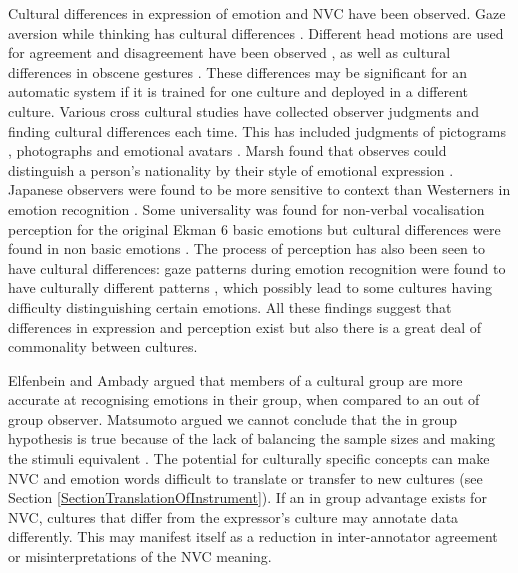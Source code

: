 
Cultural differences in expression of emotion and \ac{NVC} have been observed. Gaze aversion while thinking has cultural differences \cite{McCarthy2006}. Different head motions are used for agreement and disagreement have been observed \cite{Kassabova2008}, as well as cultural differences in obscene gestures \cite{Knapp2009}. These differences may be significant for an automatic system if it is trained for one culture and deployed in a different culture. Various cross cultural studies have collected observer judgments and finding cultural differences each time. This has included judgments of pictograms \cite{Cho2007}, photographs \cite{Matsumoto08} and emotional avatars \cite{Massaro96} \cite{Koda2007}. Marsh \etal found that observes could distinguish a person's nationality by their style of emotional expression \cite{Marsh2003}. Japanese observers were found to be more sensitive to context than Westerners in emotion recognition \cite{Masuda2008}. Some universality was found for non-verbal vocalisation perception for the original Ekman 6 basic emotions but cultural differences were found in non basic emotions \cite{Sauter2009}. The process of perception has also been seen to have cultural differences: gaze patterns during emotion recognition were found to have culturally different patterns \cite{Jack2009}, which possibly lead to some cultures having difficulty distinguishing certain emotions. All these findings suggest that differences in expression and perception exist but also there is a great deal of commonality between cultures.



Elfenbein and Ambady \cite{Elfenbein2002b} \cite{Elfenbein2002} argued that members of a cultural group are more accurate at recognising emotions in their group, when compared to an out of group observer. Matsumoto argued we cannot conclude that the in group hypothesis is true because of the lack of balancing the sample sizes and making the stimuli equivalent \cite{Matsumoto2006}. The potential for culturally specific concepts can make \ac{NVC} and emotion words difficult to translate or transfer to new cultures (see Section \ref{SectionTranslationOfInstrument}). If an in group advantage exists for \ac{NVC}, cultures that differ from the expressor's culture may annotate data differently. This may manifest itself as a reduction in inter-annotator agreement or misinterpretations of the \ac{NVC} meaning. 

